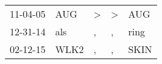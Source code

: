 \begin{supertabular}{lllll}
 11-04-05 &   AUG &  \textgreater &  \textgreater &   AUG \\
 12-31-14 &   als &             , &             , &  ring \\
 02-12-15 &  WLK2 &             , &             , &  SKIN \\
\end{supertabular}
